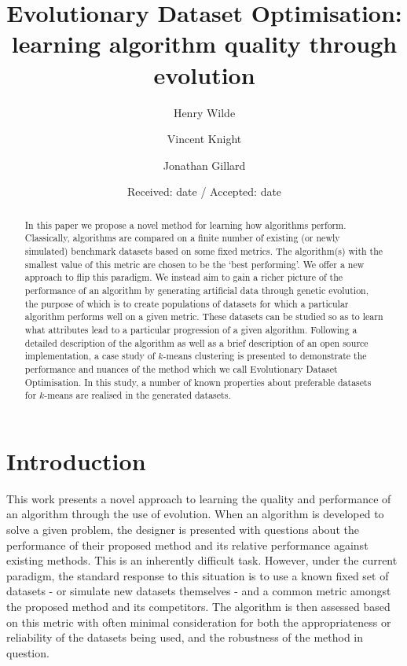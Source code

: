 \documentclass[smallextended]{svjour3}
\title{%
    Evolutionary Dataset Optimisation:
    learning algorithm quality through evolution
}
\author{Henry Wilde \and Vincent Knight \and Jonathan Gillard}
\institute{%
    School of Mathematics, Senghennydd Rd, Cardiff, WALES CF24 4AG \\
    \textit{\email{\{wildehd, knightva, gillardjw\}@cardiff.ac.uk}}
}
\date{Received: date / Accepted: date}
\begin{document}
\maketitle%


\begin{abstract}
    In this paper we propose a novel method for learning how algorithms perform.
    Classically, algorithms are compared on a finite number of existing (or
    newly simulated) benchmark datasets based on some fixed metrics. The
    algorithm(s) with the smallest value of this metric are chosen to be the
    `best performing'. We offer a new approach to flip this paradigm. We
    instead aim to gain a richer picture of the performance of an algorithm by
    generating artificial data through genetic evolution, the purpose of which
    is to create populations of datasets for which a particular algorithm
    performs well on a given metric. These datasets can be studied so as to
    learn what attributes lead to a particular progression of a given algorithm.
    Following a detailed description of the algorithm as well as a brief
    description of an open source implementation, a case study of \(k\)-means
    clustering is presented to demonstrate the performance and nuances of the
    method which we call Evolutionary Dataset Optimisation. In this study, a
    number of known properties about preferable datasets for \(k\)-means are
    realised in the generated datasets.

\end{abstract}


\section{Introduction}\label{section:introduction}

This work presents a novel approach to learning the quality and performance of
an algorithm through the use of evolution. When an algorithm is developed to
solve a given problem, the designer is presented with questions about the
performance of their proposed method and its relative performance against
existing methods. This is an inherently difficult task. However, under the
current paradigm, the standard response to this situation is to use a known
fixed set of datasets \-- or simulate new datasets themselves \-- and a common
metric amongst the proposed method and its competitors. The algorithm is then
assessed based on this metric with often minimal consideration for both the
appropriateness or reliability of the datasets being used, and the robustness
of the method in question.
\end{document}
